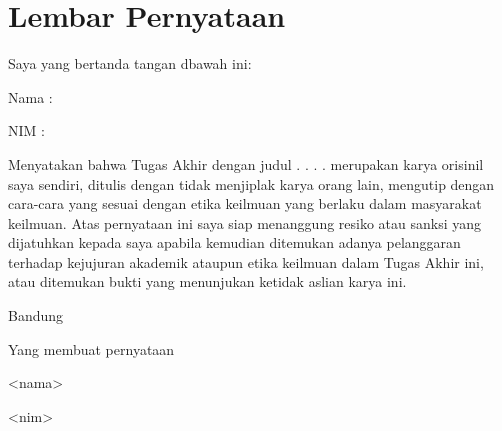 \chapter*{Lembar Pernyataan}

Saya yang bertanda tangan dbawah ini:

Nama \qquad : \qquad 

NIM  \qquad  : \qquad 

Menyatakan bahwa Tugas Akhir dengan judul . . . .
merupakan karya orisinil saya sendiri, ditulis dengan tidak menjiplak karya orang lain, mengutip
dengan cara-cara yang sesuai dengan etika keilmuan yang berlaku dalam masyarakat keilmuan.
Atas pernyataan ini saya siap menanggung resiko atau sanksi yang dijatuhkan kepada saya
apabila kemudian ditemukan adanya pelanggaran terhadap kejujuran akademik ataupun etika
keilmuan dalam Tugas Akhir ini, atau ditemukan bukti yang menunjukan ketidak aslian karya
ini.

\hfill

\hfill Bandung

\hfill Yang membuat pernyataan

\hfill

\hfill

\hfill

\hfill

\hfill

\hfill <nama>

\hfill <nim>